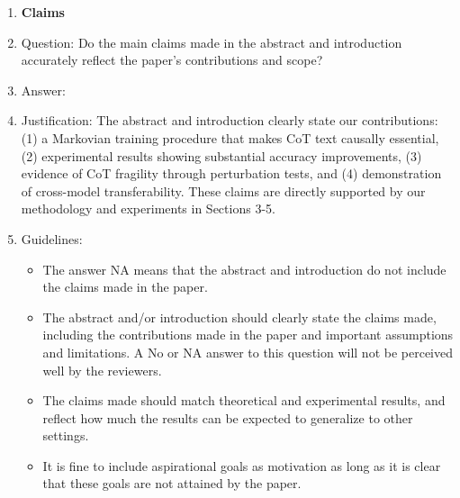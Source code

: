 \documentclass{article}
\begin{document}
\begin{enumerate}

\item {\bf Claims}
    \item[] Question: Do the main claims made in the abstract and introduction accurately reflect the paper's contributions and scope?
    \item[] Answer: \answerYes{} %
    \item[] Justification: The abstract and introduction clearly state our contributions: (1) a Markovian training procedure that makes CoT text causally essential, (2) experimental results showing substantial accuracy improvements, (3) evidence of CoT fragility through perturbation tests, and (4) demonstration of cross-model transferability. These claims are directly supported by our methodology and experiments in Sections 3-5. 
    \item[] Guidelines:
    \begin{itemize}
        \item The answer NA means that the abstract and introduction do not include the claims made in the paper.
        \item The abstract and/or introduction should clearly state the claims made, including the contributions made in the paper and important assumptions and limitations. A No or NA answer to this question will not be perceived well by the reviewers. 
        \item The claims made should match theoretical and experimental results, and reflect how much the results can be expected to generalize to other settings. 
        \item It is fine to include aspirational goals as motivation as long as it is clear that these goals are not attained by the paper. 
    \end{itemize}


\end{enumerate}
\end{document}
